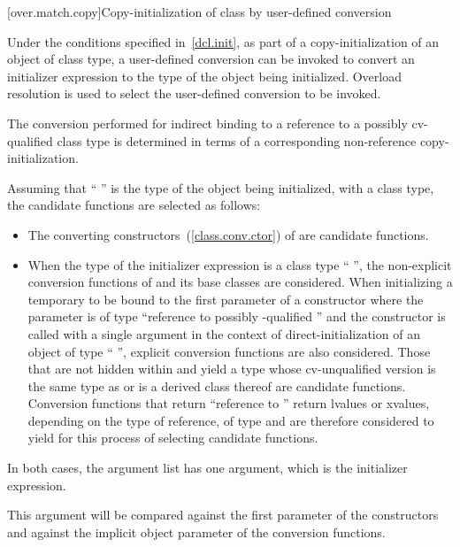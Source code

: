 [over.match.copy]{Copy-initialization of class by user-defined conversion}%

\pnum
Under the conditions specified in~\ref{dcl.init}, as
part of a copy-initialization of an object of class type, a user-defined
conversion can be invoked to convert an initializer expression to the
type of the object being initialized.
Overload resolution is used
to select the user-defined conversion to be invoked.
\begin{note} The conversion performed for indirect binding to a reference to a possibly
cv-qualified class type is determined in terms of a corresponding non-reference
copy-initialization. \end{note}
Assuming that
`` '' is the type of the object being initialized, with
a class type,
the candidate functions are selected as follows:

\begin{itemize}
\item
The converting constructors~(\ref{class.conv.ctor}) of
are candidate functions.
\item
When the type of the initializer expression is a class type
``\cv{} '',
the non-explicit conversion functions of
and its base classes are considered.
When initializing a temporary to be bound to the first parameter of a
constructor
where the parameter is of type
``reference to possibly \cv-qualified ''
and the constructor is
called with a single argument in the context of
direct-initialization of an object of type `` '', explicit
conversion functions are also considered.
Those that are not hidden within
and yield a type whose cv-unqualified version is the same type as
or is a derived class thereof
are candidate functions.
Conversion functions that return ``reference to
''
return
lvalues or xvalues, depending on the type of reference, of type
and are therefore considered to yield
for this
process of selecting candidate functions.
\end{itemize}

\pnum
In both cases, the argument list has one argument, which is the initializer
expression.
\begin{note}
This argument will be compared against
the first parameter of the constructors and against the implicit
object parameter of the conversion functions.
\end{note}

